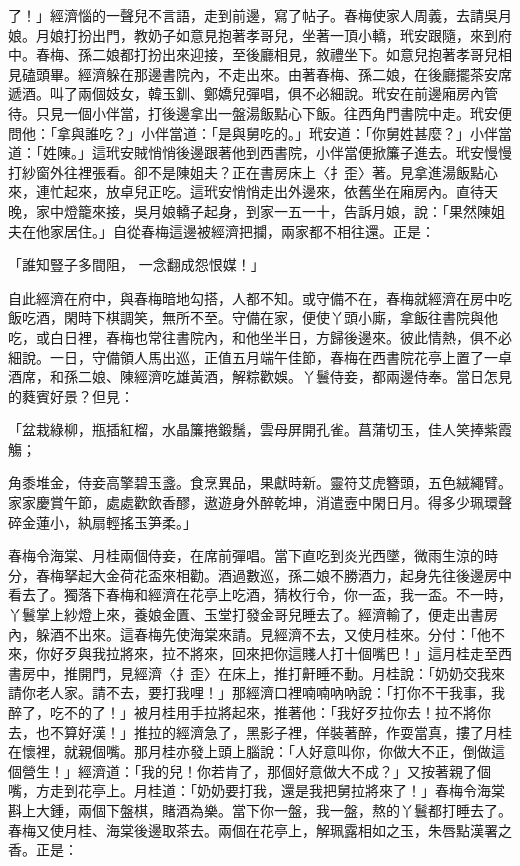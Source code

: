 了！」經濟惱的一聲兒不言語，走到前邊，寫了帖子。春梅使家人周義，去請吳月娘。月娘打扮出門，教奶子如意見抱著孝哥兒，坐著一頂小轎，玳安跟隨，來到府中。春梅、孫二娘都打扮出來迎接，至後廳相見，敘禮坐下。如意兒抱著孝哥兒相見磕頭畢。經濟躲在那邊書院內，不走出來。由著春梅、孫二娘，在後廳擺茶安席遞酒。叫了兩個妓女，韓玉釧、鄭嬌兒彈唱，俱不必細說。玳安在前邊廂房內管待。只見一個小伴當，打後邊拿出一盤湯飯點心下飯。往西角門書院中走。玳安便問他：「拿與誰吃？」小伴當道：「是與舅吃的。」玳安道：「你舅姓甚麼？」小伴當道：「姓陳。」這玳安賊悄悄後邊跟著他到西書院，小伴當便掀簾子進去。玳安慢慢打紗窗外往裡張看。卻不是陳姐夫？正在書房床上〈扌歪〉著。見拿進湯飯點心來，連忙起來，放卓兒正吃。這玳安悄悄走出外邊來，依舊坐在廂房內。直待天晚，家中燈籠來接，吳月娘轎子起身，到家一五一十，告訴月娘，說：「果然陳姐夫在他家居住。」自從春梅這邊被經濟把攔，兩家都不相往還。正是：

「誰知豎子多間阻，  一念翻成怨恨媒！」

自此經濟在府中，與春梅暗地勾搭，人都不知。或守備不在，春梅就經濟在房中吃飯吃酒，閑時下棋調笑，無所不至。守備在家，便使丫頭小廝，拿飯往書院與他吃，或白日裡，春梅也常往書院內，和他坐半日，方歸後邊來。彼此情熱，俱不必細說。一日，守備領人馬出巡，正值五月端午佳節，春梅在西書院花亭上置了一卓酒席，和孫二娘、陳經濟吃雄黃酒，解粽歡娛。丫鬟侍妾，都兩邊侍奉。當日怎見的蕤賓好景？但見：

「盆栽綠柳，瓶插紅榴，水晶簾捲鍛鬚，雲母屏開孔雀。菖蒲切玉，佳人笑捧紫霞觴；

角黍堆金，侍妾高擎碧玉盞。食烹異品，果獻時新。靈符艾虎簪頭，五色絨繩臂。家家慶賞午節，處處歡飲香醪，遨遊身外醉乾坤，消遣壼中閑日月。得多少珮環聲碎金蓮小，紈扇輕搖玉笋柔。」

春梅令海棠、月桂兩個侍妾，在席前彈唱。當下直吃到炎光西墜，微雨生涼的時分，春梅拏起大金荷花盃來相勸。酒過數巡，孫二娘不勝酒力，起身先往後邊房中看去了。獨落下春梅和經濟在花亭上吃酒，猜枚行令，你一盃，我一盃。不一時，丫鬟掌上紗燈上來，養娘金匱、玉堂打發金哥兒睡去了。經濟輸了，便走出書房內，躲酒不出來。這春梅先使海棠來請。見經濟不去，又使月桂來。分付：「他不來，你好歹與我拉將來，拉不將來，回來把你這賤人打十個嘴巴！」這月桂走至西書房中，推開門，見經濟〈扌歪〉在床上，推打鼾睡不動。月桂說：「奶奶交我來請你老人家。請不去，要打我哩！」那經濟口裡喃喃吶吶說：「打你不干我事，我醉了，吃不的了！」被月桂用手拉將起來，推著他：「我好歹拉你去！拉不將你去，也不算好漢！」推拉的經濟急了，黑影子裡，佯裝著醉，作耍當真，摟了月桂在懷裡，就親個嘴。那月桂亦發上頭上腦說：「人好意叫你，你做大不正，倒做這個營生！」經濟道：「我的兒！你若肯了，那個好意做大不成？」又按著親了個嘴，方走到花亭上。月桂道：「奶奶要打我，還是我把舅拉將來了！」春梅令海棠斟上大鍾，兩個下盤棋，賭酒為樂。當下你一盤，我一盤，熬的丫鬟都打睡去了。春梅又使月桂、海棠後邊取茶去。兩個在花亭上，解珮露相如之玉，朱唇點漢署之香。正是：

